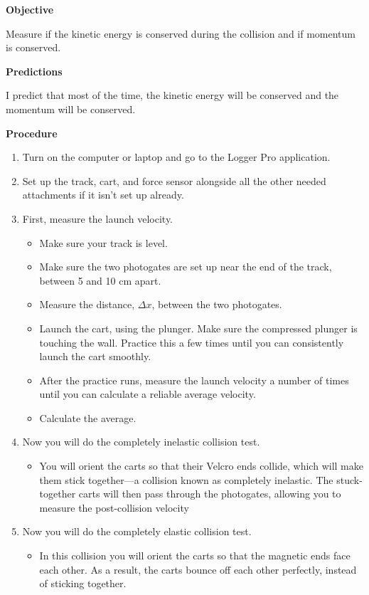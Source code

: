 \documentclass[idxtotoc,hyperref,openany]{labbook} %
\begin{document}
\hfill \break
\textbf{Objective}

Measure if the kinetic energy is conserved during the collision and if momentum is conserved.

\hfill \break
\textbf{Predictions}

I predict that most of the time, the kinetic energy will be conserved and the momentum will be conserved.

\hfill \break
\textbf{Procedure}
\begin{enumerate}
    \item Turn on the computer or laptop and go to the Logger Pro application.
    \item Set up the track, cart, and force sensor alongside all the other needed attachments if it isn't set up already.
    \item First, measure the launch velocity.
    \begin{itemize}
        \item Make sure your track is level.
        \item Make sure the two photogates are set up near the end of the track, between 5 and 10 cm apart.
        \item Measure the distance, $\Delta x$, between the two photogates.
        \item Launch the cart, using the plunger. Make sure the compressed plunger is touching the wall. Practice this a few times until you can consistently launch the cart smoothly.
        \item After the practice runs, measure the launch velocity a number of times until you can calculate a reliable average velocity.
        \item Calculate the average.
    \end{itemize}
    \item Now you will do the completely inelastic collision test.
    \begin{itemize}
        \item You will orient the carts so that their Velcro ends collide, which will make them stick together—a collision known as completely inelastic. The stuck-together carts will then pass through the photogates, allowing you to measure the post-collision velocity
    \end{itemize}
    \item Now you will do the completely elastic collision test.
    \begin{itemize}
        \item In this collision you will orient the carts so that the magnetic ends face each other. As a result, the carts bounce off each other perfectly, instead of sticking together.
    \end{itemize}
\end{enumerate}
\end{document}
